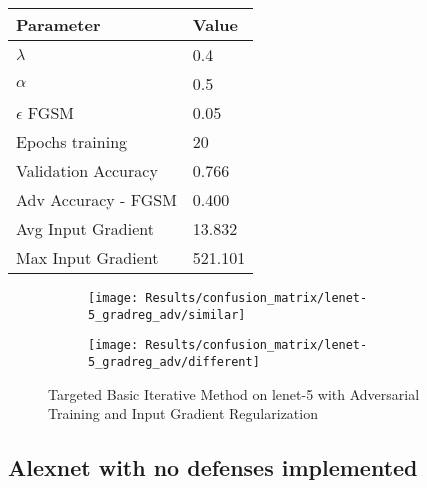 \documentclass[draft,final]{vutinfth} %
\begin{document}
\begin{table}[h]
  \centering
  \begin{tabular}{ll}
    \toprule
			Parameter			& Value   \\
    \midrule
			$\lambda$								& 0.4			\\
			$\alpha$								& 0.5			\\
			$\epsilon$ FGSM					& 0.05		\\
			Epochs training					& 20			\\
			
			Validation Accuracy			& 0.766		\\ 
			Adv Accuracy - FGSM			& 0.400		\\
			
			Avg Input Gradient			& 13.832	\\
			Max Input Gradient			& 521.101	\\
    \bottomrule
  \end{tabular}
\end{table}


\begin{figure}[h]
  \begin{subfigure}[b]{0.5\columnwidth}
		\centering
    \texttt{[image: Results/confusion\_matrix/lenet-5\_gradreg\_adv/similar]}
    \label{fig:exp:cm:lenet-5_gradreg_adv:similar}
  \end{subfigure}
  \begin{subfigure}[b]{0.5\columnwidth}
		\centering
    \texttt{[image: Results/confusion\_matrix/lenet-5\_gradreg\_adv/different]}
    \label{fig:exp:cm:lenet-5_gradreg_adv:different}
  \end{subfigure}
  \caption{Targeted Basic Iterative Method on lenet-5 with Adversarial Training and Input Gradient Regularization}
  \label{fig:exp:cm:lenet-5_gradreg_adv}
\end{figure}
\clearpage


\subsection{Alexnet with no defenses implemented}
\end{document}
